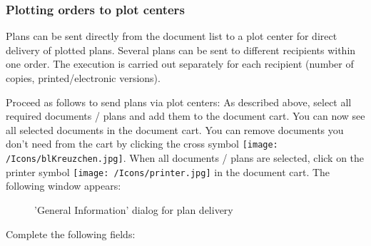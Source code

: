 \subsubsection{Plotting orders to plot centers}
\label{bkm:Ref20170609127}

Plans can be sent directly from the document list to a plot center for direct delivery of plotted plans. Several plans can be sent to different recipients within one order. The execution is carried out separately for each recipient (number of copies, printed/electronic versions).

\vspace{\baselineskip}

Proceed as follows to send plans via plot centers: As described above, select all required documents / plans and add them to the document cart. You can now see all selected documents in the document cart. You can remove documents you don't need from the cart by clicking the cross symbol \texttt{[image: /Icons/blKreuzchen.jpg]}. When all documents / plans are selected, click on the printer symbol \texttt{[image: /Icons/printer.jpg]} in the document cart. The following window appears:

\begin{figure}[H]
\caption{'General Information' dialog for plan delivery}
\end{figure}

Complete the following fields:


